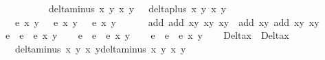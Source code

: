 \begin{isabellebody}
\ \ \ \ \ \ \ \ \ \ {\isachardoublequoteopen}delta{\isacharunderscore}minus\ x{}\ y{}\ x{}{\isacharprime}\ y{}{\isacharprime}\ {\isasymnoteq}\ {}{\isachardoublequoteclose}\ {\isachardoublequoteopen}delta{\isacharunderscore}plus\ x{}\ y{}\ x{}{\isacharprime}\ y{}{\isacharprime}\ {\isasymnoteq}\ {}{\isachardoublequoteclose}\isanewline
\ \ \ {\isachardoublequoteopen}e\ x{}\ y{}\ {\isacharequal}\ {}{\isachardoublequoteclose}\ {\isachardoublequoteopen}e\ x{}\ y{}\ {\isacharequal}\ {}{\isachardoublequoteclose}\ {\isachardoublequoteopen}e\ x{}\ y{}\ {\isacharequal}\ {}{\isachardoublequoteclose}\ \isanewline
\ \ \ {\isachardoublequoteopen}add\ {\isacharparenleft}add\ {\isacharparenleft}x{}{\isacharcomma}y{}{\isacharparenright}\ {\isacharparenleft}x{}{\isacharcomma}y{}{\isacharparenright}{\isacharparenright}\ {\isacharparenleft}x{}{\isacharcomma}y{}{\isacharparenright}\ {\isacharequal}\ add\ {\isacharparenleft}x{}{\isacharcomma}y{}{\isacharparenright}\ {\isacharparenleft}add\ {\isacharparenleft}x{}{\isacharcomma}y{}{\isacharparenright}\ {\isacharparenleft}x{}{\isacharcomma}y{}{\isacharparenright}{\isacharparenright}{\isachardoublequoteclose}\ \isanewline
%
\isadelimproof
%
\endisadelimproof
%
\isatagproof
{}\isamarkupfalse%
\ {\isacharminus}\isanewline
\ \ \isamarkupfalse%
\ e{}\ \ {\isachardoublequoteopen}e{}\ {\isacharequal}\ e\ x{}\ y{}{\isachardoublequoteclose}\isanewline
\ \ \isamarkupfalse%
\ e{}\ \ {\isachardoublequoteopen}e{}\ {\isacharequal}\ e\ x{}\ y{}{\isachardoublequoteclose}\isanewline
\ \ \isamarkupfalse%
\ e{}\ \ {\isachardoublequoteopen}e{}\ {\isacharequal}\ e\ x{}\ y{}{\isachardoublequoteclose}\isanewline
\ \ \isamarkupfalse%
\ Delta\isactrlsub x\ \ {\isachardoublequoteopen}Delta\isactrlsub x\ {\isacharequal}\ \isanewline
\ \ \ {\isacharparenleft}delta{\isacharunderscore}minus\ x{}{\isacharprime}\ y{}{\isacharprime}\ x{}\ y{}{\isacharparenright}{\isacharasterisk}{\isacharparenleft}delta{\isacharunderscore}minus\ x{}\ y{}\ x{}{\isacharprime}\ y{}{\isacharprime}{\isacharparenright}{\isacharasterisk}\isanewline

\end{isabellebody}
